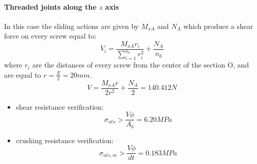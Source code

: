 \paragraph{Threaded joints along the $z$ axis} In this case the sliding actions are given by $M_{xA}$ and $N_A$ which produce a shear force on every screw equal to:
\begin{equation*}
    V_{i} = \frac{M_{xA}r_{i}}{\sum\limits_{i=1}^{n_{{b}}} r^2_{i}} + \frac{N_{A}}{n_{b}}
\end{equation*}
where $r_{i}$ are the distances of every screw from the center of the section O, and are equal to $r = \frac{E}{2} = 20 mm$.
\begin{equation*}
    V = \frac{M_{xA}r}{2r^2} +  \frac{N_{A}}{2} = 140.412 N
\end{equation*}
\begin{itemize}
    \item shear resistance verification:
    \begin{equation*}
       \sigma_{uts} > \frac{V\phi}{A_{b}} = 6.20 MPa
    \end{equation*}
    \item crushing resistance verification:
     \begin{equation*}
       \sigma_{uts,m} > \frac{V\phi}{dt} = 0.183 MPa
    \end{equation*}
\end{itemize}

